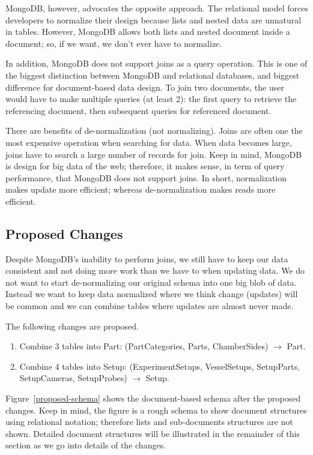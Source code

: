 MongoDB, however, advocates the opposite approach. The relational model forces developers to normalize their design because lists and nested data are unnatural in tables. However, MongoDB allows both lists and nested document inside a document; so, if we want, we don't ever have to normalize.

In addition, MongoDB does not support joins as a query operation. This is one of the biggest distinction between MongoDB and relational databases, and biggest difference for document-based data design. To join two documents, the user would have to make multiple queries (at least 2): the first query to retrieve the referencing document, then subsequent queries for referenced document.

There are benefits of de-normalization (not normalizing). Joins are often one the most expensive operation when searching for data\cite{Mishra1992, Aho1979}. When data becomes large, joins have to search a large number of records for join. Keep in mind, MongoDB is design for big data of the web; therefore, it makes sense, in term of query performance, that MongoDB does not support joins. In short, normalization makes update more efficient; whereas de-normalization makes reads more efficient.

\subsection{Proposed Changes}

Despite MongoDB's inability to perform joins, we still have to keep our data consistent and not doing more work than we have to when updating data. We do not want to start de-normalizing our original schema into one big blob of data. Instead we want to keep data normalized where we think change (updates) will be common and we can combine tables where updates are almost never made.

The following changes are proposed.

\begin{enumerate}
\item Combine 3 tables into Part: (PartCategories, Parts, ChamberSides) $\rightarrow$ Part.
\item Combine 4 tables into Setup: (ExperimentSetups, VesselSetups, SetupParts, SetupCameras, SetupProbes) $\rightarrow$ Setup.
\end{enumerate}

Figure~\ref{proposed-schema} shows the document-based schema after the proposed changes. Keep in mind, the figure is a rough schema to show document structures using relational notation; therefore lists and sub-documents structures are not shown. Detailed document structures will be illustrated in the remainder of this section as we go into details of the changes.

